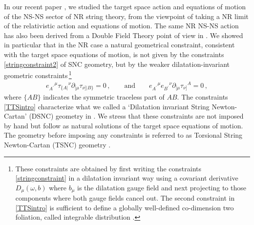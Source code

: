\documentclass[a4paper,10pt,openany]{article}
\begin{document}
	In our recent paper \cite{Bergshoeff:2021bmc}, we studied the target space action and equations of motion of the NS-NS sector of NR string theory, from the viewpoint of taking a  NR limit of the relativistic action and equations of motion. The same NR NS-NS action has also been derived from a Double Field Theory point of view in \cite{Gallegos:2020egk}. We showed in particular that in the NR case a natural geometrical constraint, consistent with  the target space equations of motion,  is not given by the  constraints \eqref{stringconstraint2} of SNC geometry, but by the weaker dilatation-invariant geometric constraints\,\footnote{These constraints are obtained by first writing the constraints  \eqref{stringconstraint} in a dilatation invariant way using a covariant derivative $D_\mu(\omega,b)$ where $b_\mu$ is the dilatation gauge field and next projecting to those components where both gauge fields cancel out. The second constraint in \eqref{TTSintro} is sufficient to define a globally well-defined co-dimension two foliation, called integrable distribution \cite{frankel_2011}.}
	\begin{align} \label{TTSintro}
		e_{A^\prime}{}^\mu \tau_{\{A|}{}^\nu \partial_{[\mu} \tau_{\nu]| B\}} =0\,,\qquad\mathrm{and}\qquad e_{A^\prime}{}^\mu e_{B^\prime}{}^\nu \partial_{[\mu} \tau_{\nu]}{}^A =0\,,
	\end{align}
	where   $\{AB\}$ indicates the symmetric traceless part of $AB$. The constraints \eqref{TTSintro} characterize what we called a `Dilatation invariant String Newton-Cartan' (DSNC) geometry in \cite{Bergshoeff:2021bmc}. We stress that these constraints are not imposed by hand but follow as natural solutions of the target space equations of motion. The geometry before imposing any constraints is referred to as Torsional String Newton-Cartan (TSNC) geometry \cite{Bergshoeff:2021bmc,Bidussi:2021ujm}.
	
\end{document}
